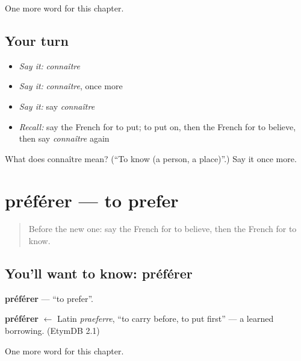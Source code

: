 \begin{grammarlens}[title={What you've built}]
One more word for this chapter.
\end{grammarlens}

\subsection*{Your turn}
\begin{itemize}
\raggedright
  \item \emph{Say it:} \emph{connaître}
  \item \emph{Say it:} \emph{connaître}, once more
  \item \emph{Say it:} say \emph{connaître}
  \item \emph{Recall:} say the French for to put; to put on, then the French for to believe, then say \emph{connaître} again
\end{itemize}

\begin{tcolorbox}[breakable,colback=teal!4,colframe=teal!35!black,title={Before you move on}]
What does connaître mean? (\textquotedblleft{}To know (a person, a place)\textquotedblright{}.) Say it once more.
\end{tcolorbox}
\section[préférer]{préférer — to prefer}

\label{lesson:FR-C138-preferer}



\begin{quote}
Before the new one: say the French for to believe, then the French for to know.
\end{quote}

\subsection*{You'll want to know: préférer}
\textbf{préférer} — \textquotedblleft{}to prefer\textquotedblright{}.

\begin{cousinweb}
\textbf{préférer} $\leftarrow$ Latin \emph{praeferre}, \textquotedblleft{}to carry before, to put first\textquotedblright{} — a learned borrowing. (EtymDB 2.1)
\end{cousinweb}

\begin{grammarlens}[title={What you've built}]
One more word for this chapter.
\end{grammarlens}

